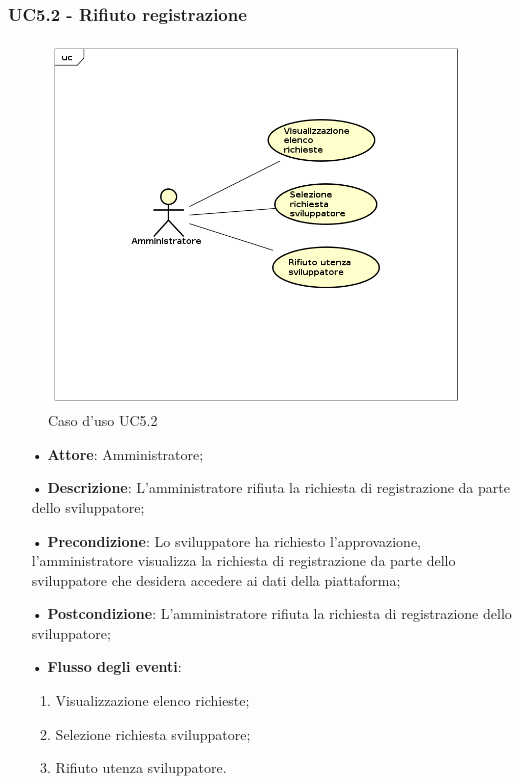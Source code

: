 \subsubsection{UC5.2 - Rifiuto registrazione}

\begin{figure}[H]
\centering
\includegraphics[width=11cm]{img/UC52.png} 
\caption{Caso d'uso UC5.2}
\end{figure}


\begin{itemize}
\item[•] \textbf{Attore}: Amministratore;

\item[•] \textbf{Descrizione}: L’amministratore rifiuta la richiesta di registrazione da parte dello sviluppatore;

\item[•] \textbf{Precondizione}: Lo sviluppatore ha richiesto l’approvazione, l’amministratore visualizza la richiesta di registrazione da parte dello sviluppatore che desidera accedere ai dati della piattaforma;

\item[•] \textbf{Postcondizione}: L’amministratore rifiuta la richiesta di registrazione dello sviluppatore;

\item[•] \textbf{Flusso degli eventi}:

\begin{enumerate}

\item Visualizzazione elenco richieste;

\item Selezione richiesta sviluppatore;

\item Rifiuto utenza sviluppatore.

\end{enumerate}
\end{itemize}
